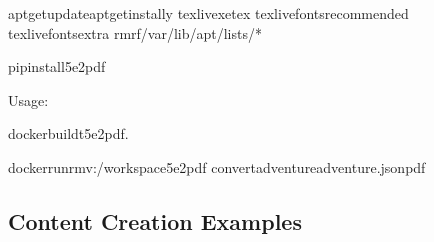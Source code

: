 \documentclass[letterpaper,10pt,english]{sphinxmanual}
\begin{document}
\begin{sphinxVerbatim}[commandchars=\\\{\}]

apt\PYGZhy{}getupdateapt\PYGZhy{}getinstall\PYGZhy{}y
texlive\PYGZhy{}xetex
texlive\PYGZhy{}fonts\PYGZhy{}recommended
texlive\PYGZhy{}fonts\PYGZhy{}extra
rm\PYGZhy{}rf/var/lib/apt/lists/*

pipinstall5e2pdf


\PYG{p}{[}\PYG{p}{]}
\end{sphinxVerbatim}

\sphinxAtStartPar
Usage:

\begin{sphinxVerbatim}[commandchars=\\\{\}]
dockerbuild\PYGZhy{}t5e2pdf.

dockerrun\PYGZhy{}\PYGZhy{}rm\PYGZhy{}v:/workspace5e2pdf
convertadventureadventure.json\PYGZhy{}\PYGZhy{}pdf
\end{sphinxVerbatim}


\subsection{Content Creation Examples}
\label{\detokenize{user-guide/examples:content-creation-examples}}
\end{document}
